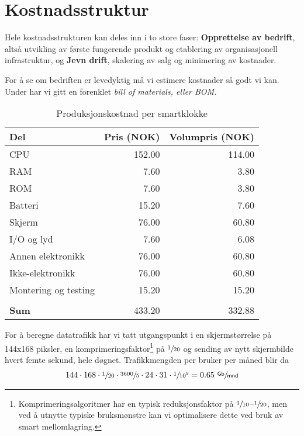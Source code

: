 \section{Kostnadsstruktur}

Hele kostnadsstrukturen kan deles inn i to store faser: \textbf{Opprettelse av
bedrift}, altså utvikling av første fungerende produkt og etablering av
organisasjonell infrastruktur, og \textbf{Jevn drift}, skalering av salg og
minimering av kostnader.

For å se om bedriften er levedyktig må vi estimere kostnader så godt vi kan.
Under har vi gitt en forenklet \em{bill of materials}, eller \em{BOM}.

\begin{table}[h]
  \centering
  \begin{tabular}{lrr}
    \textbf{Del} & \textbf{Pris (NOK)} & \textbf{Volumpris (NOK)} \\
    \hline
    CPU                  & 152.00        &  114.00 \\
    RAM                  &   7.60        &    3.80 \\
    ROM                  &   7.60        &    3.80 \\
    Batteri              &  15.20        &    7.60 \\
    Skjerm               &  76.00        &   60.80 \\
    I/O og lyd           &   7.60        &    6.08 \\
    Annen elektronikk    &  76.00        &   60.80 \\
    Ikke-elektronikk     &  76.00        &   60.80 \\
    Montering og testing &  15.20        &   15.20 \\
    \\
    \textbf{Sum}  & 433.20        &  332.88 \\
  \end{tabular}
  \caption{Produksjonskostnad per smartklokke}
  \label{table.pris.klokke}
\end{table}

For å beregne datatrafikk har vi tatt utgangspunkt i en skjermstørrelse på
144x168 piksler, en komprimeringsfaktor\footnote{Komprimeringsalgoritmer har en
  typisk reduksjonsfaktor på $\sfrac{1}{10}$--$\sfrac{1}{20}$, men ved å
  utnytte typiske bruksmønstre kan vi optimalisere dette ved bruk av smart
mellomlagring.} på $\sfrac{1}{20}$ og sending av nytt skjermbilde hvert femte
sekund, hele døgnet.  Trafikkmengden per bruker per måned blir da
%
\begin{gather*}
144\cdot168\cdot\sfrac{1}{20}\cdot\sfrac{3600}{5}\cdot24\cdot31\cdot\sfrac{1}{10^9}
= 0.65~\sfrac{\textsf{Gb}}{\textsf{mnd}}
\end{gather*}

